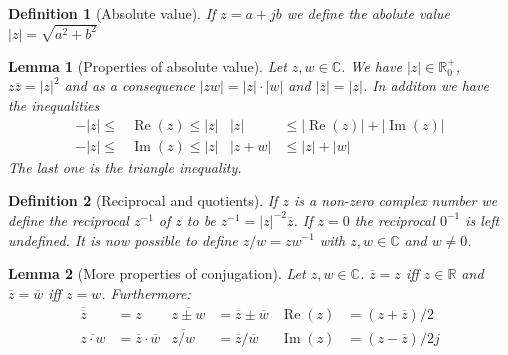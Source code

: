 \documentclass[twocolumn, small]{tex/hsrzf}
\newcommand\Rset{\mathbb{R}}
\newcommand\Cset{\mathbb{C}}
\newcommand\conj[1]{\overline{#1}}
\newcommand\len[1]{\lvert#1\rvert}
\renewcommand\Re{\operatorname{Re}}
\renewcommand\Im{\operatorname{Im}}
\theoremstyle{komfourzf}
\newtheorem{definition}{Definition}
\newtheorem{lemma}{Lemma}
\begin{document}
\begin{definition}[Absolute value]
  If \(z = a + jb\) we define the \emph{abolute value} \(\len{z} = \sqrt{a^2 + b^2}\)
\end{definition}

\begin{lemma}[Properties of absolute value]
  Let \(z,w\in\Cset\). We have \(\len{z} \in\Rset^+_0\), \(z\conj{z} = \len{z}^2\) and as a consequence \(\len{zw} = \len{z}\cdot\len{w}\) and \(\len{\conj{z}} = \len{z}\). In additon we have the inequalities
  \begin{align*}
    -\len{z} \leq &\Re(z) \leq \len{z} &
    \len{z} &\leq \len{\Re(z)} + \len{\Im(z)} \\
    -\len{z} \leq &\Im(z) \leq \len{z} &
    \len{z + w} &\leq \len{z} + \len{w}
  \end{align*}
  The last one is the \emph{triangle inequality}.
\end{lemma}

\begin{definition}[Reciprocal and quotients]
  If \(z\) is a non-zero complex number we define the \emph{reciprocal} \(z^{-1}\) of \(z\) to be \(z^{-1} = \len{z}^{-2}\conj{z}\). If \(z = 0\) the reciprocal \(0^{-1}\) is left undefined.
  It is now possible to define \(z/w = zw^{-1}\) with \(z,w \in\Cset\) and \(w \neq 0\).
\end{definition}

\begin{lemma}[More properties of conjugation]
  Let \(z,w \in\Cset\).
  \(\conj{z} = z\) iff \(z \in \Rset\) and \(\conj{z} = \conj{w}\) iff \(z = w\).
  Furthermore:
  \begin{align*}
    \conj{\conj{z}} &= z &
    \conj{z \pm  w} &= \conj{z} \pm \conj{w} &
    \Re(z) &= (z + \conj{z})/2 \\
    \conj{z\cdot w} &= \conj{z}\cdot\conj{w} &
    \conj{z/w} &= \conj{z}/\conj{w} &
    \Im(z) &= (z - \conj{z})/2j
  \end{align*}
\end{lemma}
\end{document}
